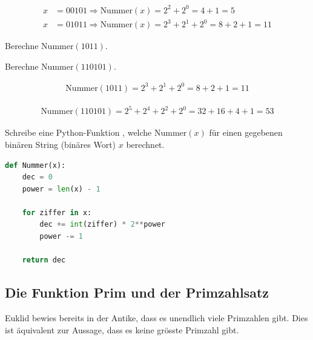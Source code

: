 \begin{myexample}
\begin{align*}
	x & = 00101 \Rightarrow \text{Nummer}(x) = 2^2 + 2^0 = 4 + 1 = 5            \\
	x & = 01011 \Rightarrow \text{Nummer}(x) = 2^3 + 2^1  + 2^0 = 8+ 2 + 1 = 11
\end{align*}
\end{myexample}

\begin{myexercise}
	\begin{aenum}
		\item Berechne $\text{Nummer}(1011)$.
		\item Berechne $\text{Nummer}(110101)$.
	\end{aenum}
	\begin{myanswer}
		\begin{aenum}
			\item \begin{align*}
				\text{Nummer}(1011) = 2^3 + 2^1 + 2^0 = 8 + 2 + 1 = 11
			\end{align*}
			\item \begin{align*}
				\text{Nummer}(110101) = 2^5 + 2^4 + 2^2 + 2^0 = 32 + 16 + 4 + 1 = 53
			\end{align*}
		\end{aenum}
	\end{myanswer}
\end{myexercise}


\begin{mychallenge}
	Schreibe eine Python-Funktion , welche $\text{Nummer}(x)$ für einen gegebenen binären String (binäres Wort) $x$ berechnet.
	\begin{myanswer}
		\begin{lstlisting}[language=Python,caption=Nummer,numbers=none]
def Nummer(x):
    dec = 0
    power = len(x) - 1

    for ziffer in x:
        dec += int(ziffer) * 2**power
        power -= 1

    return dec
\end{lstlisting}
	\end{myanswer}
\end{mychallenge}

\subsection{Die Funktion Prim und der Primzahlsatz}
Euklid bewies bereits in der Antike, dass es unendlich viele Primzahlen gibt.
Dies ist äquivalent zur Aussage, dass es keine grösste Primzahl gibt.

